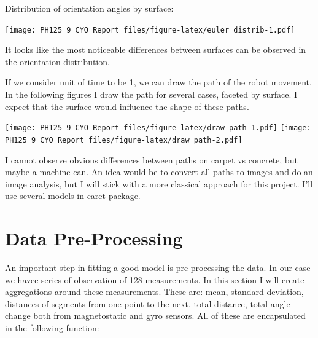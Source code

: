 \documentclass[]{article}
\begin{document}
Distribution of orientation angles by surface:

\texttt{[image: PH125\_9\_CYO\_Report\_files/figure-latex/euler distrib-1.pdf]}

It looks like the most noticeable differences between surfaces can be
observed in the orientation distribution.

If we consider unit of time to be 1, we can draw the path of the robot
movement. In the following figures I draw the path for several cases,
faceted by surface. I expect that the surface would influence the shape
of these paths.

\texttt{[image: PH125\_9\_CYO\_Report\_files/figure-latex/draw path-1.pdf]}
\texttt{[image: PH125\_9\_CYO\_Report\_files/figure-latex/draw path-2.pdf]}

I cannot observe obvious differences between paths on carpet vs
concrete, but maybe a machine can. An idea would be to convert all paths
to images and do an image analysis, but I will stick with a more
classical approach for this project. I'll use several models in caret
package.

\hypertarget{data-pre-processing}{%
\section{Data Pre-Processing}\label{data-pre-processing}}

An important step in fitting a good model is pre-processing the data. In
our case we havee series of observation of 128 measurements. In this
section I will create aggregations around these measurements. These are:
mean, standard deviation, distances of segments from one point to the
next. total distance, total angle change both from magnetostatic and
gyro sensors. All of these are encapsulated in the following function:
\end{document}
